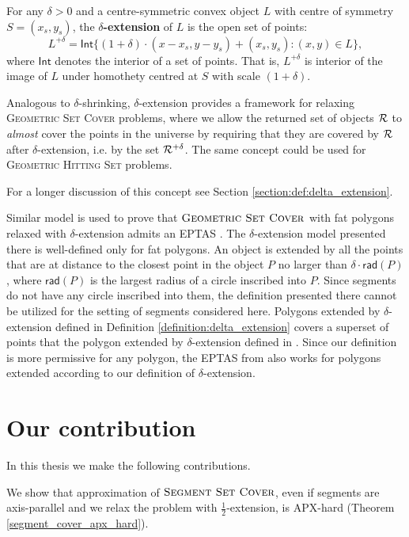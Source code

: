 \newcommand{\Int}{\mathsf{Int}}
\begin{defi}
\label{definition:delta_extension}
For any $\delta > 0$ and a centre-symmetric convex object $L$ with
centre of symmetry $S = (x_s, y_s)$,
the \textbf{$\delta$-extension} of $L$ is the open set of points:
$$L^{+\delta} = \Int\{(1 + \delta)\cdot(x - x_s, y - y_s) + (x_s, y_s) : (x, y) \in L\},$$
where $\Int$ denotes the interior of a set of points.
That is, $L^{+\delta}$ is interior of the image of $L$ under homothety centred
at $S$ with scale $(1+\delta)$.
\end{defi}

Analogous to $\delta$-shrinking,
$\delta$-extension provides a framework for relaxing
\textsc{Geometric} \textsc{Set} \textsc{Cover} problems, where we allow the returned set of
objects $\mathcal{R}$ to \textit{almost} cover the points in the universe
by requiring that they are covered by $\mathcal{R}$ after $\delta$-extension,
i.e. by the set $\mathcal{R}^{+\delta}$.
The same concept could be used for \textsc{Geometric Hitting Set} problems.
 
For a longer discussion of this concept see Section
\ref{section:def:delta_extension}.

Similar model is used to prove that $\textsc{Geometric Set Cover}$ with fat polygons
relaxed with $\delta$-extension admits an EPTAS \cite{harpeled12}.
The $\delta$-extension model presented there is well-defined only
for fat polygons. An object is extended by all the points that
are at distance to the closest point in the object $P$
no larger than $\delta\cdot \mathsf{rad}(P)$, where $\mathsf{rad}(P)$
is the largest radius of a circle inscribed into $P$.
Since segments do not have any circle inscribed into them,
the definition presented there cannot be utilized
for the setting of segments considered here.
Polygons extended by $\delta$-extension
defined in Definition \ref{definition:delta_extension}
covers a superset of points that the polygon extended
by $\delta$-extension defined in \cite{harpeled12}.
Since our definition is more permissive for any polygon,
the EPTAS from \cite{harpeled12}
also works for polygons extended
according to our definition of $\delta$-extension.

\section{Our contribution}
In this thesis we make the following contributions.

We show that approximation of $\textsc{Segment Set Cover}$,
even if segments are axis-parallel and we relax the problem with  $\frac{1}{2}$-extension,
is APX-hard (Theorem \ref{segment_cover_apx_hard}).

